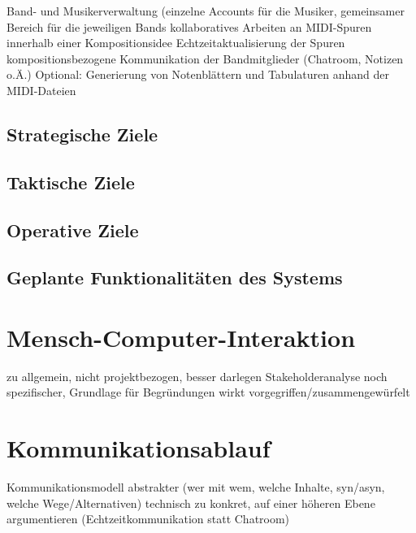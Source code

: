 \documentclass[12pt]{scrartcl}
\begin{document}
Band- und Musikerverwaltung (einzelne Accounts für die Musiker, gemeinsamer Bereich für die jeweiligen Bands
kollaboratives Arbeiten an MIDI-Spuren innerhalb einer Kompositionsidee
Echtzeitaktualisierung der Spuren
kompositionsbezogene Kommunikation der Bandmitglieder (Chatroom, Notizen o.Ä.)
Optional: Generierung von Notenblättern und Tabulaturen anhand der MIDI-Dateien



\subsection{Strategische Ziele}

\subsection{Taktische Ziele}

\subsection{Operative Ziele}

\subsection[Geplante Funktionalitäten]{Geplante Funktionalitäten des Systems}



\section{Mensch-Computer-Interaktion}

zu allgemein, nicht projektbezogen, besser darlegen
Stakeholderanalyse noch spezifischer, Grundlage für Begründungen
wirkt vorgegriffen/zusammengewürfelt


\section{Kommunikationsablauf}

Kommunikationsmodell abstrakter (wer mit wem, welche Inhalte, syn/asyn, welche Wege/Alternativen)
technisch zu konkret, auf einer höheren Ebene argumentieren (Echtzeitkommunikation statt Chatroom)
\end{document}
